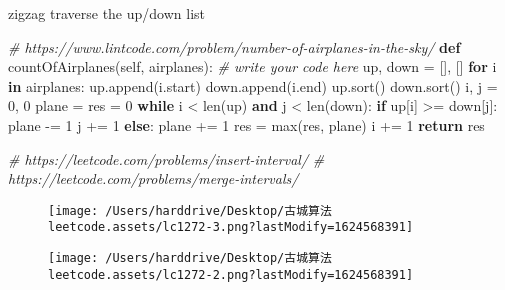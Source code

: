 \documentclass[
]{article}
\newenvironment{Shaded}{}{}
\newcommand{\BuiltInTok}[1]{#1}
\newcommand{\CommentTok}[1]{\textcolor[rgb]{0.38,0.63,0.69}{\textit{#1}}}
\newcommand{\ControlFlowTok}[1]{\textcolor[rgb]{0.00,0.44,0.13}{\textbf{#1}}}
\newcommand{\DecValTok}[1]{\textcolor[rgb]{0.25,0.63,0.44}{#1}}
\newcommand{\KeywordTok}[1]{\textcolor[rgb]{0.00,0.44,0.13}{\textbf{#1}}}
\newcommand{\NormalTok}[1]{#1}
\newcommand{\OperatorTok}[1]{\textcolor[rgb]{0.40,0.40,0.40}{#1}}
\newcommand{\VariableTok}[1]{\textcolor[rgb]{0.10,0.09,0.49}{#1}}
\begin{document}
zigzag traverse the up/down list

\begin{Shaded}
\begin{Highlighting}[]
\CommentTok{\# https://www.lintcode.com/problem/number{-}of{-}airplanes{-}in{-}the{-}sky/}
\KeywordTok{def}\NormalTok{ countOfAirplanes(}\VariableTok{self}\NormalTok{, airplanes):}
    \CommentTok{\# write your code here}
\NormalTok{    up, down }\OperatorTok{=}\NormalTok{ [], []}
    \ControlFlowTok{for}\NormalTok{ i }\KeywordTok{in}\NormalTok{ airplanes:}
\NormalTok{        up.append(i.start)}
\NormalTok{        down.append(i.end)}
\NormalTok{    up.sort()}
\NormalTok{    down.sort()}
\NormalTok{    i, j }\OperatorTok{=} \DecValTok{0}\NormalTok{, }\DecValTok{0}
\NormalTok{    plane }\OperatorTok{=}\NormalTok{ res }\OperatorTok{=} \DecValTok{0}
    \ControlFlowTok{while}\NormalTok{ i }\OperatorTok{\textless{}} \BuiltInTok{len}\NormalTok{(up) }\KeywordTok{and}\NormalTok{ j }\OperatorTok{\textless{}} \BuiltInTok{len}\NormalTok{(down):}
        \ControlFlowTok{if}\NormalTok{ up[i] }\OperatorTok{\textgreater{}=}\NormalTok{ down[j]:}
\NormalTok{            plane }\OperatorTok{{-}=} \DecValTok{1}
\NormalTok{            j }\OperatorTok{+=} \DecValTok{1}
        \ControlFlowTok{else}\NormalTok{:}
\NormalTok{            plane }\OperatorTok{+=} \DecValTok{1}
\NormalTok{            res }\OperatorTok{=} \BuiltInTok{max}\NormalTok{(res, plane)}
\NormalTok{            i }\OperatorTok{+=} \DecValTok{1}
    \ControlFlowTok{return}\NormalTok{ res}
\end{Highlighting}
\end{Shaded}

\begin{Shaded}
\begin{Highlighting}[]
\CommentTok{\# https://leetcode.com/problems/insert{-}interval/}
\CommentTok{\# https://leetcode.com/problems/merge{-}intervals/}
\end{Highlighting}
\end{Shaded}

\begin{figure}
\centering
\texttt{[image: /Users/harddrive/Desktop/古城算法leetcode.assets/lc1272-3.png?lastModify=1624568391]}
\caption{}
\end{figure}

\begin{figure}
\centering
\texttt{[image: /Users/harddrive/Desktop/古城算法leetcode.assets/lc1272-2.png?lastModify=1624568391]}
\caption{}
\end{figure}
\end{document}
